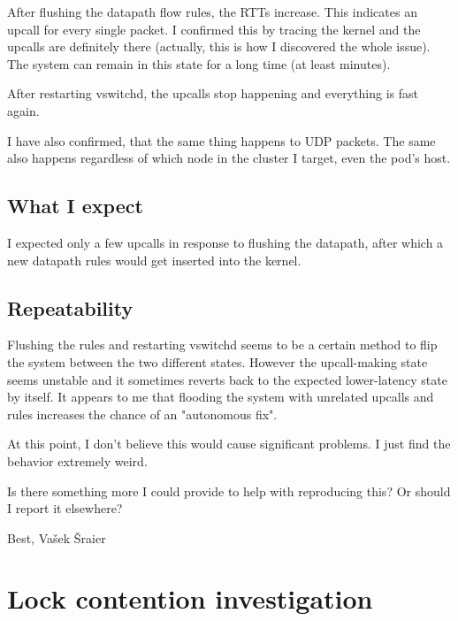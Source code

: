After flushing the datapath flow rules, the RTTs increase. This indicates an upcall for every single packet. I confirmed this by tracing the kernel and the upcalls are definitely there (actually, this is how I discovered the whole issue). The system can remain in this state for a long time (at least minutes).

After restarting vswitchd, the upcalls stop happening and everything is fast again.


I have also confirmed, that the same thing happens to UDP packets. The same also happens regardless of which node in the cluster I target, even the pod's host.


\subsection{What I expect}


I expected only a few upcalls in response to flushing the datapath, after which a new datapath rules would get inserted into the kernel.


\subsection{Repeatability}


Flushing the rules and restarting vswitchd seems to be a certain method to flip the system between the two different states. However the upcall-making state seems unstable and it sometimes reverts back to the expected lower-latency state by itself. It appears to me that flooding the system with unrelated upcalls and rules increases the chance of an "autonomous fix".


At this point, I don't believe this would cause significant problems. I just find the behavior extremely weird.

Is there something more I could provide to help with reproducing this? Or should I report it elsewhere?


Best,
Vašek Šraier 

\section{Lock contention investigation}
